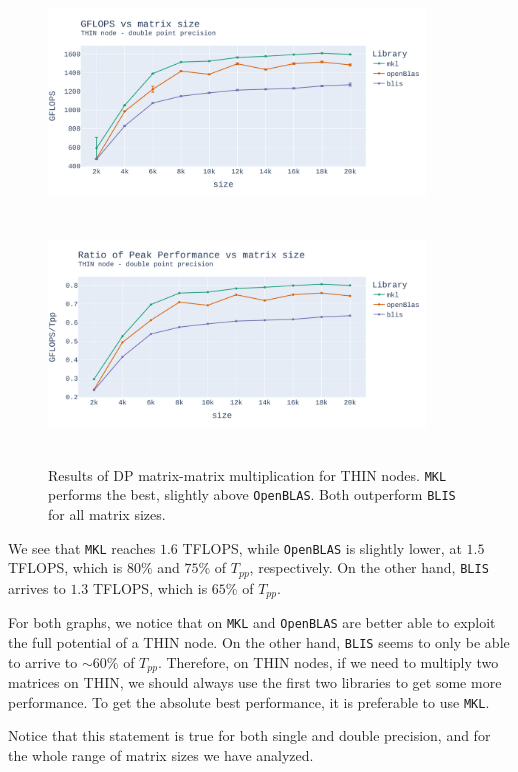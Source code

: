 \documentclass{report}
\begin{document}
\begin{figure}[h!]
\hspace*{-2.5cm}
\includegraphics[width=10cm, height=6cm]{./images/fixed_cores_thin_double_gflops.pdf}
\includegraphics[width=10cm, height=6cm]{./images/fixed_cores_thin_double_gflops_ratio.pdf}
\caption{\label{fig:fixed_cores_thin_double} Results of DP matrix-matrix multiplication 
for THIN nodes. \texttt{MKL} performs the best, slightly above \texttt{OpenBLAS}. 
Both outperform \texttt{BLIS} for all matrix sizes.}
\end{figure}
We see that \texttt{MKL} reaches $1.6$ TFLOPS, 
while \texttt{OpenBLAS} is slightly lower, at $1.5$ TFLOPS, which is $80\%$ and 
$75\%$ of $T_{pp}$, respectively. On the other hand, \texttt{BLIS} arrives to 
$1.3$ TFLOPS, which is $65\%$ of $T_{pp}$.

For both graphs, we notice that on \texttt{MKL} and \texttt{OpenBLAS} are better 
able to exploit the full potential of a THIN node. On the other hand, \texttt{BLIS}
seems to only be able to arrive to $\sim 60\%$ of $T_{pp}$. Therefore, on THIN nodes, 
if we need to multiply two matrices on THIN, we should always use the first 
two libraries to get some more performance. To get the absolute best performance, 
it is preferable to use \texttt{MKL}.

Notice that this statement is true for both single and double precision, and for 
the whole range of matrix sizes we have analyzed. 
\end{document}
